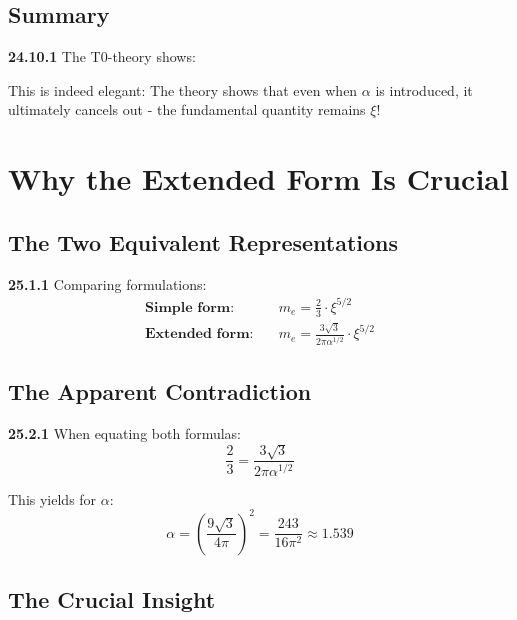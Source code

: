 \documentclass[12pt,a4paper]{article}
\begin{document}
\subsection{Summary}

\noindent \textbf{24.10.1} The T0-theory shows:
\begin{center}
\end{center}

This is indeed elegant: The theory shows that even when $\alpha$ is introduced, it ultimately cancels out - the fundamental quantity remains $\xi$!


\section{Why the Extended Form Is Crucial}

\subsection{The Two Equivalent Representations}

\noindent \textbf{25.1.1} Comparing formulations:
\begin{align*}
	\textbf{Simple form:} &\quad m_e = \frac{2}{3} \cdot \xi^{5/2} \\
	\textbf{Extended form:} &\quad m_e = \frac{3\sqrt{3}}{2\pi\alpha^{1/2}} \cdot \xi^{5/2}
\end{align*}

\subsection{The Apparent Contradiction}

\noindent \textbf{25.2.1} When equating both formulas:
\[
\frac{2}{3} = \frac{3\sqrt{3}}{2\pi\alpha^{1/2}}
\]

This yields for $\alpha$:
\[
\alpha = \left(\frac{9\sqrt{3}}{4\pi}\right)^2 = \frac{243}{16\pi^2} \approx 1.539
\]

\subsection{The Crucial Insight}
\end{document}
